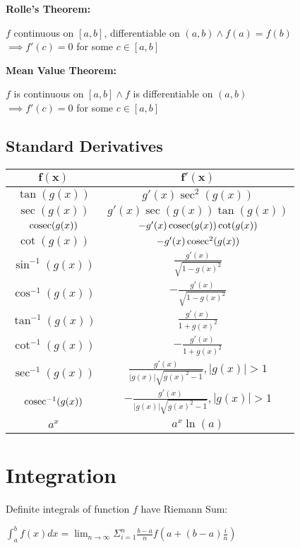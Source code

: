 \documentclass[12pt, a4paper]{article}
\begin{document}
\begin{multicols*}{3}
\textbf{Rolle's Theorem:}\\
{\centering
  $f$ continuous on $[a,b]$, differentiable on $(a,b) \land f(a) = f(b)$\\
  $\implies f'(c) = 0$ for some $c \in [a,b]$
\par}

\textbf{Mean Value Theorem:}\\
{\centering
  $f$ is continuous on $[a,b] \land f$ is differentiable on $(a,b)$\\
  $\implies f'(c) = 0$ for some $c \in [a,b]$
\par}

\subsection{Standard Derivatives}
{\centering
\begin{tabular}{|c|c|}
\hline
$\mathbf{f(x)}$ & $\mathbf{f'(x)}$ \\ \hline
$\tan(g(x))$ & $g'(x)\sec^2(g(x))$ \\ \hline
$\sec(g(x))$ & $g'(x)\sec(g(x))\tan(g(x))$ \\ \hline
$\operatorname{cosec}(g(x))$ & $-g'(x)\operatorname{cosec}(g(x))\cot(g(x))$ \\ \hline
$\cot(g(x))$ & $-g'(x)\operatorname{cosec}^2(g(x))$ \\ \hline
$\sin^{-1}(g(x))$ & $\frac{g'(x)}{\sqrt{1-g(x)^2}}$ \\ \hline
$\cos^{-1}(g(x))$ & $-\frac{g'(x)}{\sqrt{1-g(x)^2}}$ \\ \hline
$\tan^{-1}(g(x))$ & $\frac{g'(x)}{1+g(x)^2}$ \\ \hline
$\cot^{-1}(g(x))$ & $-\frac{g'(x)}{1+g(x)^2}$ \\ \hline
$\sec^{-1}(g(x))$ & $\frac{g'(x)}{|g(x)|\sqrt{g(x)^2 - 1}}, |g(x)|>1$ \\ \hline
$\operatorname{cosec}^{-1}(g(x))$ & $-\frac{g'(x)}{|g(x)|\sqrt{g(x)^2 - 1}}, |g(x)|>1$ \\ \hline
$a^x$ & $a^x\ln(a)$ \\ \hline
\end{tabular}
\par}
\section{Integration}
Definite integrals of function $f$ have Riemann Sum:\\
{\centering
  $\displaystyle \int^b_a f(x)dx = \lim_{n\rightarrow\infty}\Sigma^n_{i=1} \frac{b-a}{n}f\left(a+(b-a)\frac{i}{n}\right)$
\par}


\end{multicols*}
\end{document}
